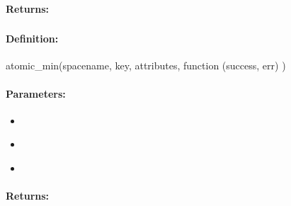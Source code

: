 \paragraph{Returns:}


\pagebreak
\subsubsection{}
\label{api:nodejs:atomic_min}


\paragraph{Definition:}
\begin{javascriptcode}
atomic_min(spacename, key, attributes, function (success, err) {})
\end{javascriptcode}
\paragraph{Parameters:}
\begin{itemize}[noitemsep]
\item {}\\

\item {}\\

\item {}\\

\end{itemize}

\paragraph{Returns:}


\pagebreak
\subsubsection{}
\label{api:nodejs:cond_atomic_min}


